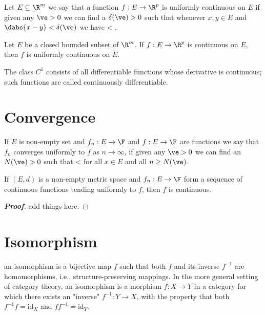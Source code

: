 \begin{definition}\label{def:uniformly_continous}
Let $E\subseteq \R^m$ we say that a function $f:E\to \R^p$ is uniformly continuous on $E$ if given any $\ve>0$ we can find a $\delta(\ve)>0$ such that whenever $x,y\in E$ and $\dabs{x-y} < \delta(\ve)$ we have
\be
{} < \ve.
\ee
\end{definition}

\begin{theorem} \label{thm:_uniformly_continuous}
Let $E$ be a closed bounded subset of $\R^m$. If $f: E\to \R^p$ is continuous on $E$, then $f$ is uniformly continuous on $E$.
\end{theorem}

\begin{definition}\label{def:continously_differentiable_met_top}
The class $C^1$ consists of all differentiable functions whose derivative is continuous; such functions are called continuously differentiable.
\end{definition}

\section{Convergence}

\begin{definition}\label{def:uniform_convergence_met_top}
If $E$ is non-empty set and $f_n:E\to \F$ and $f:E\to\F$ are functions we say that $f_n$ converges uniformly to $f$ as $n\to \infty$, if given any $\ve>0$ we can find an $N(\ve)>0$ such that
\be
{} < \ve
\ee
for all $x\in E$ and all $n\geq N(\ve)$.
\end{definition}

\begin{theorem}\label{thm:function_uniform_convergence_continuous}
If $(E,d)$ is a non-empty metric space and $f_n: E\to \F$ form a sequence of continuous functions tending uniformly to $f$, then $f$ is continuous.
\end{theorem}


\begin{proof}[{\bf Proof}]
add things here.
\end{proof}




\section{Isomorphism}

\begin{definition}
an isomorphism is a bijective map $f$ such that both $f$ and its inverse $f^{-1}$ are homomorphisms, i.e., structure-preserving mappings. In the more general setting of category theory, an isomorphism is a morphism $f: X \to Y$ in a category for which there exists an "inverse" $f^{-1}: Y \to X$, with the property that both $f^{-1}f = \text{id}_X$ and $f f^{-1} = \text{id}_Y$.
\end{definition}

